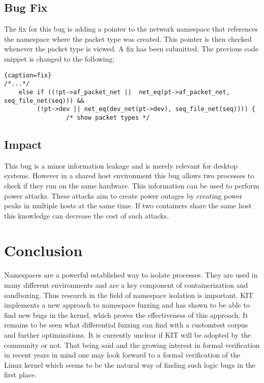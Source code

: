 \documentclass[10pt,twocolumn,a4paper]{article}
\begin{document}
\subsection{Bug Fix}
The fix for this bug is adding a pointer to the network namespace that references the namespace
where the packet type was created. This pointer is then checked whenever the packet type is
viewed. A fix has been submitted.\cite{4}
The previous code snippet is changed to the following:
\begin{lstlisting}{caption=fix}
/*...*/
	else if ((!pt->af_packet_net ||  net_eq(pt->af_packet_net, seq_file_net(seq))) &&
		 (!pt->dev || net_eq(dev_net(pt->dev), seq_file_net(seq)))) {
                 /* show packet types */
\end{lstlisting}
\cite{4}
\subsection{Impact}
This bug is a minor information leakage and is merely relevant for desktop systems.
However in a shared host environment this bug allows two processes to check if they run on the same
hardware. This information can be used to perform power attacks. These attacks aim to create power
outages by creating power peaks in multiple hosts at the same time. If two containers share the same
host this knowledge can decrease the cost of such attacks\cite{7}.
\section{Conclusion}
Namespaces are a powerful established way to isolate processes. They are used in many different
environments and are a key component of containerization and sandboxing. Thus research in the field of namespace isolation is
important. KIT implements a new approach to namespace fuzzing and has shown to be able to find new bugs in the
kernel, which proves the effectiveness of this approach. It remains to be seen what differential
fuzzing can find with a customtest corpus and further optimizations. It is currently unclear if
KIT will be adopted by the community or not. That being said and the growing interest in formal
verification in recent years in mind one may look forward to a formal verification of the Linux
kernel which seems to be the natural way of finding such logic bugs in the first place.


\end{document}
